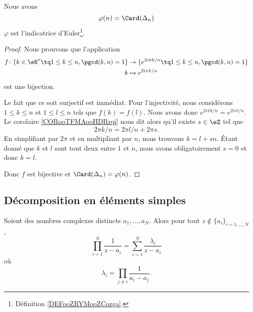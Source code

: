 \begin{proposition}		\label{PROPooFKCHooWdFicM}
	Nous avons
	\begin{equation}    \label{EqEulerGqPsvi}
		\varphi(n)=\Card(\Delta_n)
	\end{equation}
	\( \varphi\) est l'indicatrice d'Euler\footnote{Définition \ref{DEFooZRYMooZCozga}.}.
\end{proposition}

\begin{proof}
	Nous prouvons que l'application
	\begin{equation}
		\begin{aligned}
			f\colon \{ k\in \eN^*\tq 1\leq k\leq n,\pgcd(k,n)=1 \} & \to \{ e^{2i\pi k/n}\tq 1\leq k\leq n,\pgcd(k,n)=1 \} \\
			k                                                      & \mapsto e^{2i\pi k/n}
		\end{aligned}
	\end{equation}
	est une bijection.

	Le fait que ce soit surjectif est immédiat. Pour l'injectivité, nous considérons \( 1\leq k\leq n\) et \( 1\leq l\leq n\) tels que \( f(k)=f(l)\). Nous avons donc \( e^{2i\pi k/n}=e^{2i\pi l/n}\). Le corolaire \ref{CORooTFMAooHDRrqi} nous dit alors qu'il existe \( s\in \eZ\) tel que
	\begin{equation}
		2\pi k/n=2\pi l/n+2\pi s.
	\end{equation}
	En simplifiant par \( 2\pi\) et en multipliant par \( n\), nous trouvons \( k=l+sn\). Étant donné que \( k\) et \( l\) sont tout deux entre \( 1\) et \( n\), nous avons obligatoirement \( s=0\) et donc \( k=l\).

	Donc \( f\) est bijective et \( \Card(\Delta_n)=\varphi(n)\).
\end{proof}

\subsection{Décomposition en éléments simples}
\label{SUBSECooSIYXooDDHUdD}

\begin{lemma}     \label{LEMooABJMooJTUpgV}
	Soient des nombres complexes distincts \( a_1,\ldots, a_N\). Alors pour tout \( z\notin\{ a_i \}_{i=1,\ldots, N}\),
	\begin{equation}
		\prod_{i=1}^N  \frac{1}{z-a_i }=\sum_{i=1}^N\frac{ \lambda_i }{ z-a_i }
	\end{equation}
	où
	\begin{equation}
		\lambda_i=\prod_{j\neq i}\frac{1}{ a_i-a_j }.
	\end{equation}
\end{lemma}

